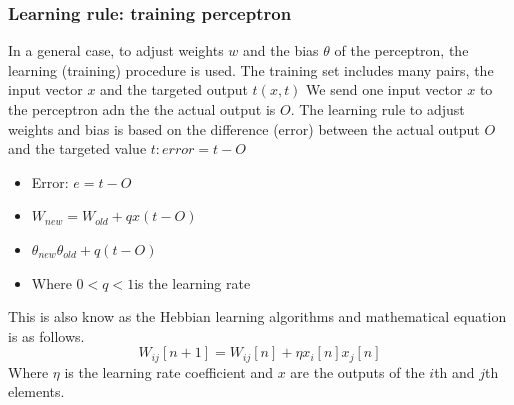 \subsubsection{Learning rule: training perceptron}
In a general case, to adjust weights $w$ and the bias $\theta$ of the perceptron, the learning (training) procedure is used. The training set includes many pairs, the input vector $x$ and the targeted output $t(x,t)$ We send one input vector $x$ to the perceptron adn the the actual output is $O$. The learning rule to adjust weights and bias is based on the difference (error) between the actual output $O$ and the targeted value $t:error = t-O$
\begin{itemize}
    \item Error: $e= t-O$
    \item $W_{new} = W_{old} +qx(t-O)$
    \item $\theta_{new} \theta_{old} + q(t-O)$
    \item Where $0<q<1$is the learning rate
\end{itemize}
This is also know as the Hebbian learning algorithms and mathematical equation is as follows.
\begin{equation}
    W_{ij}[n+1] = W_{ij}[n] + \eta x_i[n]x_j[n]
\end{equation}
Where $\eta$ is the learning rate coefficient and $x$ are the outputs of the $i$th and $j$th elements.
